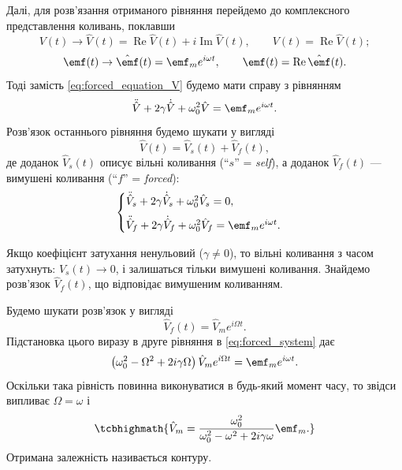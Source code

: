 Далі, для розв'язання отриманого рівняння перейдемо до комплексного
представлення коливань, поклавши
\begin{equation}\label{eq:complex_representation}
	V(t) \to \hat{V}(t) = \operatorname{Re}\hat{V}(t) + i\operatorname{Im}\hat{V}(t), \qquad
	V(t) = \operatorname{Re}\hat{V}(t);
\end{equation}
\begin{equation}\label{eq:complex_EMF}
	\emf(t) \to \hat{\emf}(t) = \emf_m e^{i\omega t}, \qquad
	\emf(t) = \operatorname{Re}\hat{\emf}(t).
\end{equation}
Тоді замість \eqref{eq:forced_equation_V} будемо мати справу з рівнянням
\begin{equation}\label{eq:complex_forced}
	\ddot{\hat{V}} + 2\gamma\dot{\hat{V}} + \omega_0^2 \hat{V} = \emf_m e^{i\omega t}.
\end{equation}
Розв'язок останнього рівняння будемо шукати у вигляді
\begin{equation}\label{eq:solution_decomposition}
	\hat{V}(t) = \hat{V}_s(t) + \hat{V}_f(t),
\end{equation}
де доданок $\hat{V}_s(t)$ описує вільні коливання (\enquote{$s$} = \emph{self}), а доданок $\hat{V}_f(t)$ --- вимушені коливання (\enquote{$f$} = \emph{forced}):
\begin{equation}\label{eq:forced_system}
	\begin{cases}
		\ddot{\hat{V}}_s + 2\gamma\dot{\hat{V}}_s + \omega_0^2 \hat{V}_s = 0, \\[6pt]
		\ddot{\hat{V}}_f + 2\gamma\dot{\hat{V}}_f + \omega_0^2 \hat{V}_f = \emf_m e^{i\omega t}.
	\end{cases}
\end{equation}

Якщо коефіцієнт затухання ненульовий ($\gamma \neq 0$), то вільні коливання з часом затухнуть: $V_s(t) \to 0$, і залишаться тільки вимушені
коливання. Знайдемо розв'язок $\hat{V}_f(t)$, що відповідає вимушеним коливанням.

Будемо шукати розв'язок у вигляді
\begin{equation}\label{eq:ansatz_forced}
	\hat{V}_f(t) = \hat{V}_m e^{i\Omega t}.
\end{equation}
Підстановка цього виразу в друге рівняння в \eqref{eq:forced_system} дає
\begin{equation}\label{eq:substitution_forced}
	\left(\omega_0^2 - \Omega^2 + 2i\gamma\Omega\right)\hat{V}_m e^{i\Omega t} = \emf_m e^{i\omega t}.
\end{equation}
Оскільки така рівність повинна виконуватися в будь-який момент часу, то звідси випливає $\Omega = \omega$ і
\begin{equation}\label{eq:V0_frequency_response}
	\tcbhighmath{
		\hat{V}_m = \frac{\omega_0^2}{\omega_0^2 - \omega^2 + 2i\gamma\omega}\emf_m.
	}
\end{equation}
Отримана залежність називається  контуру.

